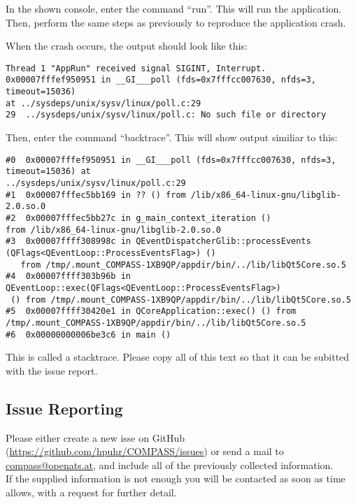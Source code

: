In the shown console, enter the command ``run''. This will run the application. Then, perform the same steps as previously to reproduce the application crash.

When the crash occurs, the output should look like this:

\begin{verbatim}
Thread 1 "AppRun" received signal SIGINT, Interrupt.
0x00007fffef950951 in __GI___poll (fds=0x7fffcc007630, nfds=3, timeout=15036) 
at ../sysdeps/unix/sysv/linux/poll.c:29
29	../sysdeps/unix/sysv/linux/poll.c: No such file or directory
\end{verbatim}

Then, enter the command ``backtrace''. This will show output similiar to this:

\begin{verbatim}
#0  0x00007fffef950951 in __GI___poll (fds=0x7fffcc007630, nfds=3, timeout=15036) at 
../sysdeps/unix/sysv/linux/poll.c:29
#1  0x00007fffec5bb169 in ?? () from /lib/x86_64-linux-gnu/libglib-2.0.so.0
#2  0x00007fffec5bb27c in g_main_context_iteration () 
from /lib/x86_64-linux-gnu/libglib-2.0.so.0
#3  0x00007ffff308998c in QEventDispatcherGlib::processEvents
(QFlags<QEventLoop::ProcessEventsFlag>) ()
   from /tmp/.mount_COMPASS-1XB9QP/appdir/bin/../lib/libQt5Core.so.5
#4  0x00007ffff303b96b in QEventLoop::exec(QFlags<QEventLoop::ProcessEventsFlag>)
 () from /tmp/.mount_COMPASS-1XB9QP/appdir/bin/../lib/libQt5Core.so.5
#5  0x00007ffff30420e1 in QCoreApplication::exec() () from 
/tmp/.mount_COMPASS-1XB9QP/appdir/bin/../lib/libQt5Core.so.5
#6  0x00000000006be3c6 in main ()
\end{verbatim}

This is called a stacktrace. Please copy all of this text so that it can be subitted with the issue report.


\subsection{Issue Reporting}

Please either create a new isse on GitHub (\url{https://github.com/hpuhr/COMPASS/issues}) or send a mail to \href{mailto:compass@openats.at}{compass@openats.at}, and include all of the previously collected information. \\

If the supplied information is not enough you will be contacted as soon as time allows, with a request for further detail.


